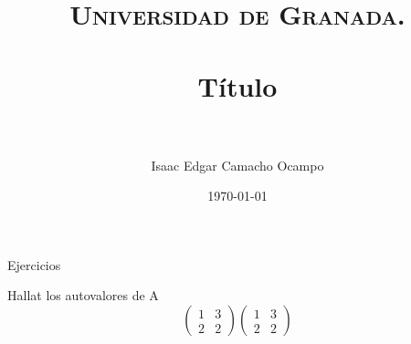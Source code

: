 \documentclass[paper=a4, fontsize=11pt, spanish]{scrartcl}
\title{
  \normalfont \normalsize 
  \textsc{Universidad de Granada.} \\ [25pt] %
  \horrule{0.5pt} \\[0.4cm] %
  \huge Título \\ %
  \horrule{2pt} \\[0.5cm] %
}
\author{Isaac Edgar Camacho Ocampo} %
\date{\normalsize\today} %
\numberwithin{equation}{section} %
\numberwithin{figure}{section} %
\numberwithin{table}{section} %
\begin{document}
\maketitle Ejercicios

Hallat los autovalores de A
\[ 
  
\begin{equation*}
    \left(
        \begin{matrix}
        1 & 3 \\
        2 & 2 
        \end{matrix}
    \right)


\left(
\begin{matrix}
  1 & 3 \\
  2 & 2
\end{matrix}
\right)

  \end{equation*}
\]
\end{document}
